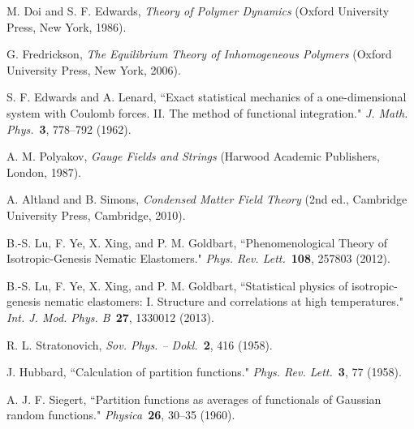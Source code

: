 \documentclass[jcp,aps,twocolumn,showpacs,supergroupedaddress,epsfig,amsmath,amssymb,eqsecnum]{revtex4}
\begin{document}
\begin{thebibliography}{99}

M. Doi and S. F. Edwards, 
{\em Theory of Polymer Dynamics} 
(Oxford University Press, New York, 1986).

G. Fredrickson, 
{\em The Equilibrium Theory of Inhomogeneous Polymers} 
(Oxford University Press, New York, 2006).  

S. F. Edwards and A. Lenard, ``Exact statistical mechanics of a one-dimensional system with Coulomb forces. II. The method of functional integration."
{\em J. Math. Phys.}~{\bf 3}, 778--792 (1962).

A. M. Polyakov, {\em Gauge Fields and Strings} (Harwood Academic Publishers, London, 1987).

A. Altland and B. Simons, {\em Condensed Matter Field Theory} (2nd ed., Cambridge University Press, Cambridge, 2010).

B.-S. Lu, F. Ye, X. Xing, and P. M. Goldbart, 
``Phenomenological Theory of Isotropic-Genesis Nematic Elastomers."
{\em Phys. Rev. Lett.}~{\bf 108}, 257803 (2012).

B.-S. Lu, F. Ye, X. Xing, and P. M. Goldbart, 
``Statistical physics of isotropic-genesis nematic elastomers: I. Structure and correlations at high temperatures."
{\em Int. J. Mod. Phys. B}~{\bf 27}, 1330012 (2013).

R. L. Stratonovich, {\em Sov. Phys. -- Dokl.}~{\bf 2}, 416 (1958). 

J. Hubbard, ``Calculation of partition functions." 
{\em Phys. Rev. Lett.}~{\bf 3}, 77 (1958).    

A. J. F. Siegert, ``Partition functions as averages of functionals of Gaussian random functions." {\em Physica}~{\bf 26}, 30--35 (1960). 





\end{thebibliography}
\end{document}
